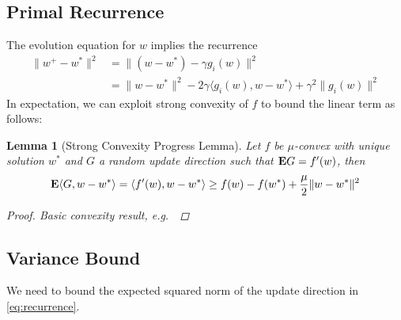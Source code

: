 \documentclass{article}
\newtheorem{lemma}{Lemma}
\newcommand{\E}{{\bf E}}
\begin{document}
\subsection{Primal Recurrence}

The evolution equation for $w$ implies the recurrence 
\begin{align}
\| w^+ - w^* \|^2 & = \| (w-w^*) - \gamma g_i(w) \|^2 \nonumber
\\ & = \| w - w^* \|^2 - 2 \gamma \langle g_i(w), w-w^*\rangle + \gamma^2 \| g_i(w) \|^2
\label{eq:recurrence}
\end{align}
In expectation, we can exploit strong convexity of $f$ to bound the linear term as follows:
\begin{lemma}[Strong Convexity Progress Lemma] Let $f$ be $\mu$-convex with unique solution $w^*$ and $G$ a random update direction such that $\E G=f'(w)$, then  
\begin{align}
\E \langle G, w-w^* \rangle  = \langle f'(w), w-w^* \rangle \ge  f(w) - f(w^*)+ \frac \mu 2  \| w-w^*\|^2
\label{eq:naive-strong-convexity}
\end{align}
\label{lemma:naive-strong-convexity}
\begin{proof} Basic convexity result, e.g.~\cite{} 
\end{proof}
\end{lemma}

\subsection{Variance Bound} 

We need to bound the expected squared norm of the update direction in \eqref{eq:recurrence}.  
\end{document}
